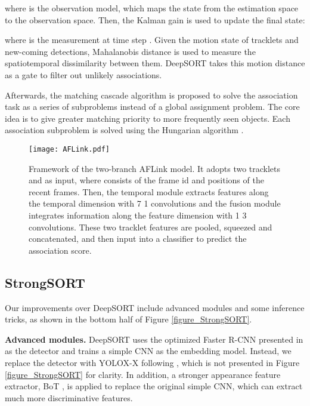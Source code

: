 \documentclass[lettersize,journal]{IEEEtran}
\begin{document}
where  is the observation model, which maps the state from the estimation space to the observation space.
Then, the Kalman gain  is used to update the final state:


where  is the measurement at time step .
Given the motion state of tracklets and new-coming detections,
Mahalanobis distance is used to measure the spatiotemporal dissimilarity between them.
DeepSORT takes this motion distance as a gate to filter out unlikely associations.

Afterwards, the matching cascade algorithm is proposed to solve the association task as a series of subproblems instead of a global assignment problem. 
The core idea is to give greater matching priority to more frequently seen objects.
Each association subproblem is solved using the Hungarian algorithm \cite{kuhn1955hungarian}.

\begin{figure*}[t]
  \centering
  \texttt{[image: AFLink.pdf]}
  \caption{
    Framework of the two-branch AFLink model.
    It adopts two tracklets  and  as input, 
    where  consists of the frame id  and positions  of the recent  frames.
    Then, the temporal module extracts features along the temporal dimension with 7  1 convolutions 
    and the fusion module integrates information along the feature dimension with 1  3 convolutions.
    These two tracklet features are pooled, squeezed and concatenated, and then input into a classifier to predict the association score. 
  }
  \label{figure_AFLink}
\end{figure*}

\subsection{StrongSORT}

Our improvements over DeepSORT include advanced modules and some inference tricks, 
as shown in the bottom half of Figure \ref{figure_StrongSORT}.

\noindent \textbf{Advanced modules.} 
DeepSORT uses the optimized Faster R-CNN \cite{ren2015faster} presented in \cite{yu2016poi} as the detector
and trains a simple CNN as the embedding model.
Instead, we replace the detector with YOLOX-X \cite{ge2021yolox} following \cite{zhang2022bytetrack},
which is not presented in Figure \ref{figure_StrongSORT} for clarity.
In addition, a stronger appearance feature extractor, BoT \cite{luo2019strong}, is applied to replace the original simple CNN, which can extract much more discriminative features. 
\end{document}
